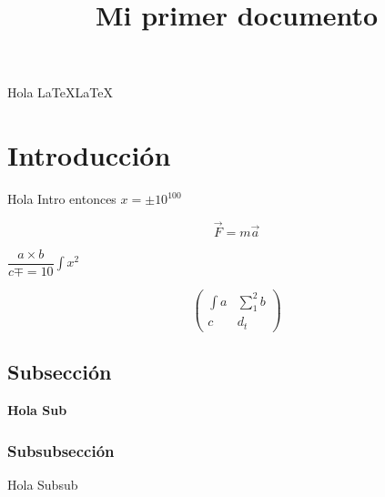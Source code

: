 \documentclass{article}
\title{Mi primer documento}
\begin{document}
\maketitle

Hola \LaTeX LaTeX

\section*{Introducci\'on}
Hola Intro entonces $x= \pm 10 ^{100}$

\begin{equation}
\vec{F}=m \vec{a}
\end{equation}

$\dfrac{a \times b}{c \mp=10} \int x^{2}$

\begin{equation}
\left(
\begin{array}{cc}
\int{a} & \sum_{1}^{2}{b} \\
c & d_{t}
\end{array}
\right)
\end{equation}


\subsection{Subsecci\'on}
\textbf{Hola Sub}

\subsubsection{Subsubsecci\'on}
Hola Subsub\\
\end{document}
